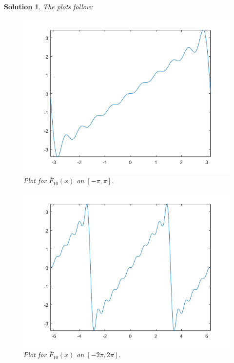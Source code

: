 \documentclass[leqno]{article}
\theoremstyle{nonumberplain}
\newtheorem{solution}{Solution}
\begin{document}
\begin{solution}
The plots follow: 

\begin{figure}[h]
    \centering
    \includegraphics{problem_3_1_hw_5.png}
    \caption{Plot for $\overline{F}_{10}(x)$ on $[-\pi,\pi]$.}
    \label{fig:my_label}
\end{figure}
\pagebreak

\begin{figure}[h]
    \centering
    \includegraphics{problem_3_2_hw_5.png}
    \caption{Plot for $\overline{F}_{10}(x)$ on $[-2\pi,2\pi]$.}
    \label{fig:my_label}
\end{figure}
\pagebreak


\end{solution}
\end{document}

